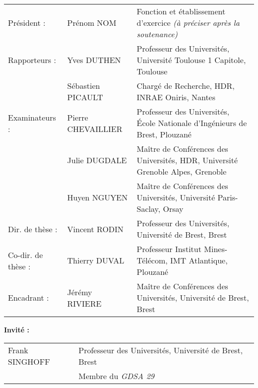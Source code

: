 {\begin{tabular}{@{}lll}
Pr\'{e}sident :        & Pr\'{e}nom NOM & Fonction et \'{e}tablissement d'exercice \textit{(à préciser après la soutenance)} \\
Rapporteurs :          & Yves DUTHEN & Professeur des Universités, Université Toulouse 1 Capitole, Toulouse \\
                       & Sébastien PICAULT & Chargé de Recherche, HDR, INRAE Oniris, Nantes\\
Examinateurs :         & Pierre CHEVAILLIER & Professeur des Universités, École Nationale d'Ingénieurs de Brest, Plouzané \\
                       & Julie DUGDALE & Maître de Conférences des Universités, HDR, Université Grenoble Alpes, Grenoble\\
                       & Huyen NGUYEN & Maître de Conférences des Universités, Université Paris-Saclay, Orsay \\
Dir. de th\`{e}se :    & Vincent RODIN & Professeur des Universités, Université de Brest, Brest \\
Co-dir. de th\`{e}se : & Thierry DUVAL & Professeur Institut Mines-Télécom, IMT Atlantique, Plouzané \\
Encadrant : & Jérémy RIVIERE & Maître de Conférences des Universités, Université de Brest, Brest \\
\end{tabular}

\vspace{\baselineskip}
{\normalsize \textbf{Invit\'{e} :}}\\ \newline
\footnotesize
\begin{tabular}{@{}ll}
Frank SINGHOFF & Professeur des Universités, Université de Brest, Brest\\
 & Membre du \textit{GDSA 29}
\end{tabular}

\vspace{2.0cm}
}


\maketitle
